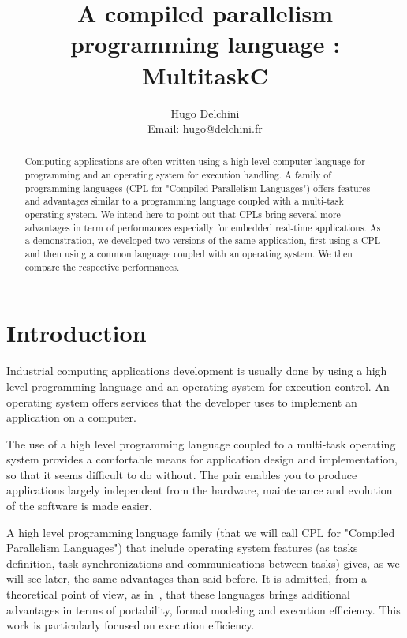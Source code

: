 \documentclass[10pt]{report}
\begin{document}
\title{A compiled parallelism programming language : MultitaskC}

\author{
Hugo Delchini\\
Email: hugo@delchini.fr\\
}

\maketitle
\thispagestyle{empty}

\begin{abstract}

Computing applications are often written using a high level computer language for programming and an
operating system for execution handling. A family of programming languages (CPL for "Compiled Parallelism
Languages") offers features and advantages similar to a programming language coupled with a multi-task
operating system. We intend here to point out that CPLs bring several more advantages in term of performances
especially for embedded real-time applications. As a demonstration, we developed two versions of the same application,
first using a CPL and then using a common language coupled with an operating system. We then compare the respective performances.

\end{abstract}

\tableofcontents

\chapter{Introduction}
\label{sec:intro}

Industrial computing applications development is usually done by using a high level programming language
and an operating system for execution control. An operating system offers services that the developer
uses to implement an application on a computer.

The use of a high level programming language coupled to a multi-task operating system provides a comfortable
means for application design and implementation, so that it seems difficult to do without. The pair enables you
to produce applications largely independent from the hardware, maintenance and evolution of the software is made easier.

A high level programming language family (that we will call CPL for "Compiled Parallelism Languages")
that include operating system features (as tasks definition, task synchronizations and communications
between tasks) gives, as we will see later, the same advantages than said before. It is admitted, from a
theoretical point of view, as in~\cite{Halbwachs:91}, that these languages brings additional advantages
in terms of portability, formal modeling and execution efficiency. This work is particularly focused on
execution efficiency.
\end{document}
